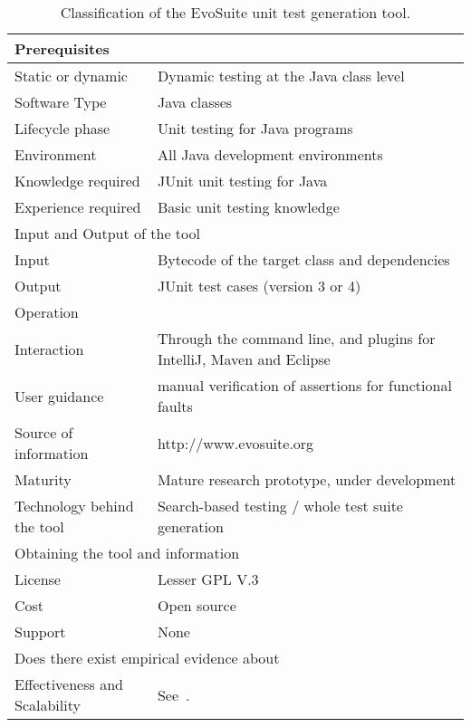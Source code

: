 \documentclass[10pt,conference,compsocconf]{IEEEtran}
\newcommand{\EVOSUITE}{{\sc EvoSuite}\xspace}
\begin{document}
\begin{table}[!h]
\renewcommand{\arraystretch}{1.3}
\caption{Classification of the \EVOSUITE unit test generation tool.}\label{tool-description}
\begin{tabular}{|l|p{5cm}|}
  \hline
  \multicolumn{2}{|l|}{Prerequisites} \\
  \hline
  Static or dynamic &  Dynamic testing at the Java class level\\
  Software Type &  Java classes\\
  Lifecycle phase&  Unit testing for Java programs\\
  Environment&  All Java development environments \\
  Knowledge required & JUnit unit testing for Java\\
  Experience required &  Basic unit testing knowledge\\
 \hline
  \multicolumn{2}{|l|}{Input and Output of the tool} \\
  \hline
 Input & Bytecode of the target class and dependencies \\
\hline
Output&  JUnit test cases (version 3 or 4)\\
 
  \hline
  \multicolumn{2}{|l|}{Operation} \\
  \hline
  Interaction &  Through the command line, and plugins for IntelliJ, Maven and Eclipse\\
  User guidance &  manual verification of assertions for functional faults\\
  Source of information &  http://www.evosuite.org \\
  Maturity&  Mature research prototype, under development\\
  Technology behind the tool & Search-based testing / whole test suite generation\\
\hline
  \multicolumn{2}{|l|}{Obtaining the tool and information} \\
  \hline
License & Lesser GPL V.3\\
Cost & Open source\\
Support & None \\
\hline
\hline
  \multicolumn{2}{|l|}{Does there exist empirical evidence about} \\
  \hline
  Effectiveness and Scalability & See~\cite{GoA_TSE12,fraser2014large}. \\
\hline
\end{tabular}\vspace{-1em}
\end{table}
\end{document}
